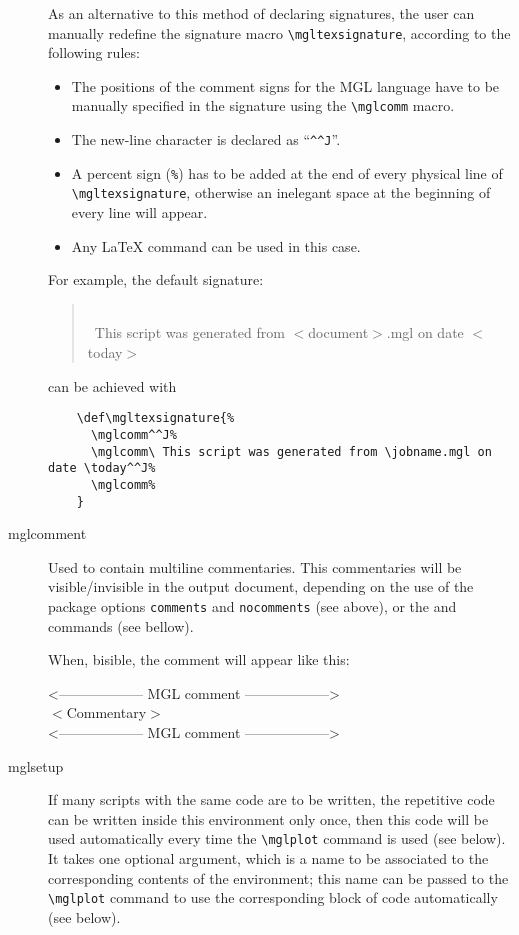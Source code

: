 \documentclass{article}
\begin{document}
\begin{description}
As an alternative to this method of declaring signatures, the user can manually redefine the signature macro \texttt{\textbackslash{}mgltexsignature}, according to the following rules:
  \begin{itemize}
    \item The positions of the comment signs for the MGL language have to be manually specified in the signature using the \texttt{\textbackslash{}mglcomm} macro.
    \item The new-line character is declared as ``\verb|^^J|''.
    \item A percent sign (\texttt{\%}) has to be added at the end of every physical line of \texttt{\textbackslash{}mgltexsignature}, otherwise an inelegant space at the beginning of every line will appear.
  \item Any \LaTeX{} command can be used in this case.
\end{itemize}
  For example, the default signature:
  \begin{quote}\small
    \mglcomm\\
    \mglcomm\ This script was generated from $<$document$>$.mgl on date $<$today$>$\\
    \mglcomm
  \end{quote}
  can be achieved with
  \begin{verbatim}
    \def\mgltexsignature{%
      \mglcomm^^J%
      \mglcomm\ This script was generated from \jobname.mgl on date \today^^J%
      \mglcomm%
    }
  \end{verbatim}
\item[mglcomment]
  Used to contain multiline commentaries. This commentaries will be visible/invisible in the output document, depending on the use of the package options \texttt{comments} and \texttt{nocomments} (see above), or the \texttt{\mglcomments} and \texttt{\mglnocomments} commands (see bellow).
  
  When, bisible, the comment will appear like this:
  \begin{center}
    \makeatletter
    \verbatim@font
    \makeatother
    <------------------ MGL comment ------------------>\\
    $<$Commentary$>$\\
    <------------------ MGL comment ------------------>\\
  \end{center}
\item[mglsetup]
	If many scripts with the same code are to be written, the repetitive code can be written inside this environment only once, then this code will be used automatically every time the \texttt{\textbackslash{}mglplot} command is used (see below). It takes one optional argument, which is a name to be associated to the corresponding contents of the environment; this name can be passed to the \texttt{\textbackslash{}mglplot} command to use the corresponding block of code automatically (see below).
\end{description}
\end{document}
